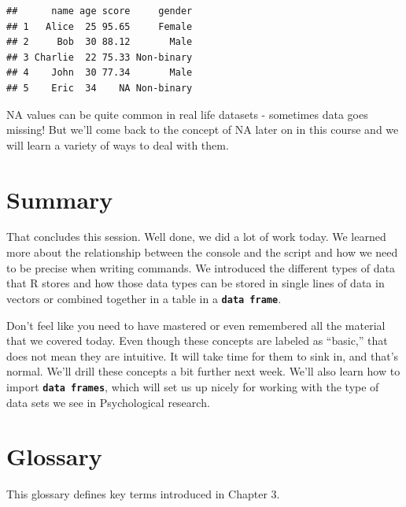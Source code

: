 \documentclass[
]{book}
\begin{document}
\begin{verbatim}
##      name age score     gender
## 1   Alice  25 95.65     Female
## 2     Bob  30 88.12       Male
## 3 Charlie  22 75.33 Non-binary
## 4    John  30 77.34       Male
## 5    Eric  34    NA Non-binary
\end{verbatim}

NA values can be quite common in real life datasets - sometimes data goes missing! But we'll come back to the concept of NA later on in this course and we will learn a variety of ways to deal with them.

\section{Summary}\label{summary-1}

That concludes this session. Well done, we did a lot of work today. We learned more about the relationship between the console and the script and how we need to be precise when writing commands. We introduced the different types of data that R stores and how those data types can be stored in single lines of data in vectors or combined together in a table in a \textbf{\texttt{data\ frame}}.

Don't feel like you need to have mastered or even remembered all the material that we covered today. Even though these concepts are labeled as ``basic,'' that does not mean they are intuitive. It will take time for them to sink in, and that's normal. We'll drill these concepts a bit further next week. We'll also learn how to import \textbf{\texttt{data\ frames}}, which will set us up nicely for working with the type of data sets we see in Psychological research.

\section{Glossary}\label{glossary-1}

This glossary defines key terms introduced in Chapter 3.
\end{document}
